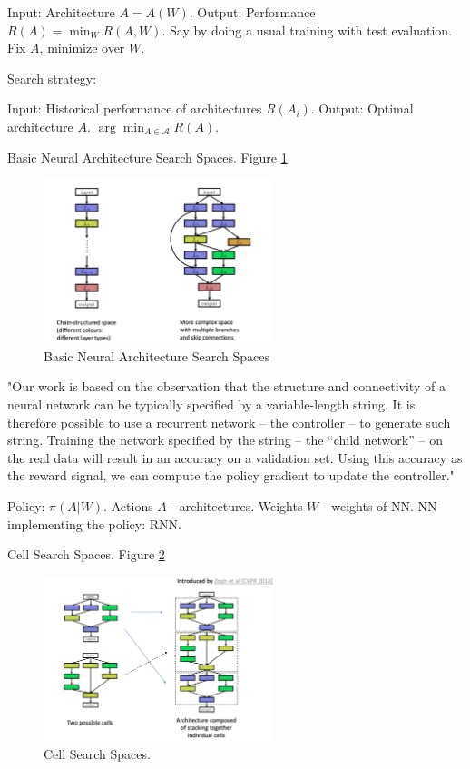 \documentclass[english]{article}
\begin{document}
Input: Architecture $A=A(W)$. Output: Performance $R(A)=\min_W R(A,W)$. Say by doing a usual training with test evaluation. Fix $A$, minimize over $W$.


Search strategy: 

Input: Historical performance of architectures $R(A_i)$. Output: Optimal architecture $A$.  $\arg\min_{A\in\mathcal{A}} R(A)$.





\item Basic Neural Architecture Search Spaces. Figure \ref{nas2}  
\begin{figure}[h!]
  \centering
  \includegraphics[width=0.6\textwidth]{nas2.png}
  \caption{Basic Neural Architecture Search Spaces}
  \label{nas2}
\end{figure}

"Our work is based on the observation that the structure and connectivity of a neural network can be typically specified by a variable-length string. It is therefore possible to use
a recurrent network – the controller – to generate such string. Training the network specified by the
string – the “child network” – on the real data will result in an accuracy on a validation set. Using
this accuracy as the reward signal, we can compute the policy gradient to update the controller."


Policy: $\pi(A|W)$. Actions $A$ - architectures. Weights $W$ - weights of NN. NN implementing the policy: RNN.


\item Cell Search Spaces. Figure \ref{nas3}  


\begin{figure}[h!]
  \centering
  \includegraphics[width=0.6\textwidth]{nas3.png}
  \caption{Cell Search Spaces.}
  \label{nas3}
\end{figure}
\end{document}
